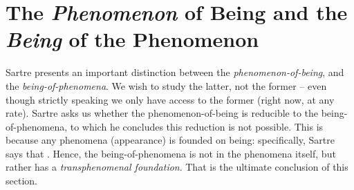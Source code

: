 \section{The \emph{Phenomenon} of Being and the \\ \emph{Being} of the Phenomenon}

Sartre presents an important distinction between the \emph{phenomenon-of-being}, and the \emph{being-of-phenomena}. We wish to study the latter, not the former -- even though strictly speaking we only have access to the former (right now, at any rate). Sartre asks us whether the phenomenon-of-being is reducible to the being-of-phenomena, to which he concludes this reduction is not possible. This is because any phenomena (appearance) is founded on being: specifically, Sartre says that .
Hence, the being-of-phenomena is not in the phenomena itself, but rather has a \emph{transphenomenal foundation}. That is the ultimate conclusion of this section.

